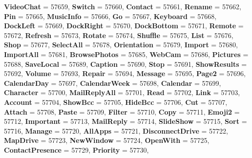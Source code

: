 \begin{DoxyCompactItemize}
{\bfseries Video\+Chat} = 57659, 
{\bfseries Switch} = 57660, 
{\bfseries Contact} = 57661, 
{\bfseries Rename} = 57662, 
\newline
{\bfseries Pin} = 57665, 
{\bfseries Music\+Info} = 57666, 
{\bfseries Go} = 57667, 
{\bfseries Keyboard} = 57668, 
\newline
{\bfseries Dock\+Left} = 57669, 
{\bfseries Dock\+Right} = 57670, 
{\bfseries Dock\+Bottom} = 57671, 
{\bfseries Remote} = 57672, 
\newline
{\bfseries Refresh} = 57673, 
{\bfseries Rotate} = 57674, 
{\bfseries Shuffle} = 57675, 
{\bfseries List} = 57676, 
\newline
{\bfseries Shop} = 57677, 
{\bfseries Select\+All} = 57678, 
{\bfseries Orientation} = 57679, 
{\bfseries Import} = 57680, 
\newline
{\bfseries Import\+All} = 57681, 
{\bfseries Browse\+Photos} = 57685, 
{\bfseries Web\+Cam} = 57686, 
{\bfseries Pictures} = 57688, 
\newline
{\bfseries Save\+Local} = 57689, 
{\bfseries Caption} = 57690, 
{\bfseries Stop} = 57691, 
{\bfseries Show\+Results} = 57692, 
\newline
{\bfseries Volume} = 57693, 
{\bfseries Repair} = 57694, 
{\bfseries Message} = 57695, 
{\bfseries Page2} = 57696, 
\newline
{\bfseries Calendar\+Day} = 57697, 
{\bfseries Calendar\+Week} = 57698, 
{\bfseries Calendar} = 57699, 
{\bfseries Character} = 57700, 
\newline
{\bfseries Mail\+Reply\+All} = 57701, 
{\bfseries Read} = 57702, 
{\bfseries Link} = 57703, 
{\bfseries Account} = 57704, 
\newline
{\bfseries Show\+Bcc} = 57705, 
{\bfseries Hide\+Bcc} = 57706, 
{\bfseries Cut} = 57707, 
{\bfseries Attach} = 57708, 
\newline
{\bfseries Paste} = 57709, 
{\bfseries Filter} = 57710, 
{\bfseries Copy} = 57711, 
{\bfseries Emoji2} = 57712, 
\newline
{\bfseries Important} = 57713, 
{\bfseries Mail\+Reply} = 57714, 
{\bfseries Slide\+Show} = 57715, 
{\bfseries Sort} = 57716, 
\newline
{\bfseries Manage} = 57720, 
{\bfseries All\+Apps} = 57721, 
{\bfseries Disconnect\+Drive} = 57722, 
{\bfseries Map\+Drive} = 57723, 
\newline
{\bfseries New\+Window} = 57724, 
{\bfseries Open\+With} = 57725, 
{\bfseries Contact\+Presence} = 57729, 
{\bfseries Priority} = 57730, 
\newline

\end{DoxyCompactItemize}
